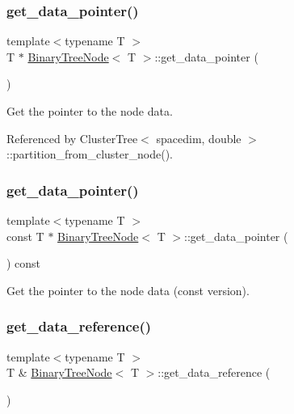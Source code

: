 \subsubsection{\texorpdfstring{get\+\_\+data\+\_\+pointer()}{get\_data\_pointer()}\hspace{0.1cm}{\footnotesize\ttfamily [1/2]}}
{\footnotesize\ttfamily template$<$typename T $>$ \\
T $\ast$ \hyperlink{classBinaryTreeNode}{Binary\+Tree\+Node}$<$ T $>$\+::get\+\_\+data\+\_\+pointer (\begin{DoxyParamCaption}{ }\end{DoxyParamCaption})}

Get the pointer to the node data. 

Referenced by Cluster\+Tree$<$ spacedim, double $>$\+::partition\+\_\+from\+\_\+cluster\+\_\+node().

\mbox{\label{classBinaryTreeNode_acb9eb20251b6fdde199264527499c9ca}} 
\subsubsection{\texorpdfstring{get\+\_\+data\+\_\+pointer()}{get\_data\_pointer()}\hspace{0.1cm}{\footnotesize\ttfamily [2/2]}}
{\footnotesize\ttfamily template$<$typename T $>$ \\
const T $\ast$ \hyperlink{classBinaryTreeNode}{Binary\+Tree\+Node}$<$ T $>$\+::get\+\_\+data\+\_\+pointer (\begin{DoxyParamCaption}{ }\end{DoxyParamCaption}) const}

Get the pointer to the node data (const version). \mbox{\label{classBinaryTreeNode_ad24220a78b219a242dc66be86cf6ddd9}} 
\subsubsection{\texorpdfstring{get\+\_\+data\+\_\+reference()}{get\_data\_reference()}\hspace{0.1cm}{\footnotesize\ttfamily [1/2]}}
{\footnotesize\ttfamily template$<$typename T $>$ \\
T \& \hyperlink{classBinaryTreeNode}{Binary\+Tree\+Node}$<$ T $>$\+::get\+\_\+data\+\_\+reference (\begin{DoxyParamCaption}{ }\end{DoxyParamCaption})}

